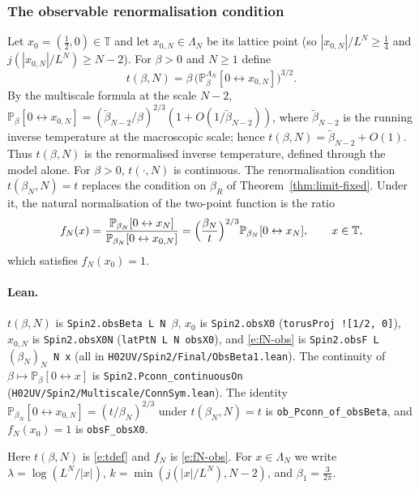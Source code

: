 \documentclass[11pt]{amsart}
\theoremstyle{definition}
\theoremstyle{remark}
\numberwithin{equation}{section}
\newcommand{\T}{\mathbb{T}}
\newcommand{\conn}{\leftrightarrow}
\begin{document}
\subsubsection{The observable renormalisation condition}\label{sec:obs}
Let $x_0=(\frac12,0)\in\T$ and let $x_{0,N}\in\Lambda_N$ be its lattice point (so $|x_{0,N}|/L^N\ge\frac14$
and $j(|x_{0,N}|/L^N)\ge N-2$). For $\beta>0$ and $N\ge1$ define
\begin{equation}\label{e:tdef}
  t(\beta,N)=\beta\,\bigl(\mathbb{P}^{\Lambda_N}_\beta[0\conn x_{0,N}]\bigr)^{3/2}.
\end{equation}
By the multiscale formula at the scale $N-2$, $\mathbb{P}_\beta[0\conn x_{0,N}]=(\tilde\beta_{N-2}/\beta)^{2/3}(1+O(1/\tilde\beta_{N-2}))$,
where $\tilde\beta_{N-2}$ is the running inverse temperature at the macroscopic scale; hence
$t(\beta,N)=\tilde\beta_{N-2}+O(1)$. Thus $t(\beta,N)$ is the renormalised inverse temperature, defined through the
model alone. For $\beta>0$, $t(\cdot,N)$ is continuous. The renormalisation condition $t(\beta_N,N)=t$ replaces the
condition on $\beta_R$ of Theorem~\ref{thm:limit-fixed}. Under it, the natural normalisation of the two-point
function is the ratio
\begin{equation}\label{e:fN-obs}
  f_N(x)=\frac{\mathbb{P}_{\beta_N}[0\conn x_N]}{\mathbb{P}_{\beta_N}[0\conn x_{0,N}]}=\Bigl(\frac{\beta_N}{t}\Bigr)^{2/3}\mathbb{P}_{\beta_N}[0\conn x_N],
  \qquad x\in\T,
\end{equation}
which satisfies $f_N(x_0)=1$.

\paragraph{Lean.} $t(\beta,N)$ is \texttt{Spin2.obsBeta L N $\beta$}, $x_0$ is \texttt{Spin2.obsX0}
(\texttt{torusProj ![1/2, 0]}), $x_{0,N}$ is \texttt{Spin2.obsX0N} (\texttt{latPtN L N obsX0}), and \eqref{e:fN-obs}
is \texttt{Spin2.obsF L $(\beta_N)_N$ N x} (all in \texttt{H02UV/Spin2/Final/ObsBeta1.lean}). The continuity of
$\beta\mapsto\mathbb{P}_\beta[0\conn x]$ is \texttt{Spin2.Pconn\_continuousOn} (\texttt{H02UV/Spin2/Multiscale/ConnSym.lean}).
The identity $\mathbb{P}_{\beta_N}[0\conn x_{0,N}]=(t/\beta_N)^{2/3}$ under $t(\beta_N,N)=t$ is \texttt{ob\_Pconn\_of\_obsBeta},
and $f_N(x_0)=1$ is \texttt{obsF\_obsX0}.

Here $t(\beta,N)$ is \eqref{e:tdef} and $f_N$ is \eqref{e:fN-obs}. For $x\in\Lambda_N$ we write
$\lambda=\log(L^N/|x|)$, $k=\min(j(|x|/L^N),N-2)$, and $\beta_1=\frac3{2\pi}$.
\end{document}
